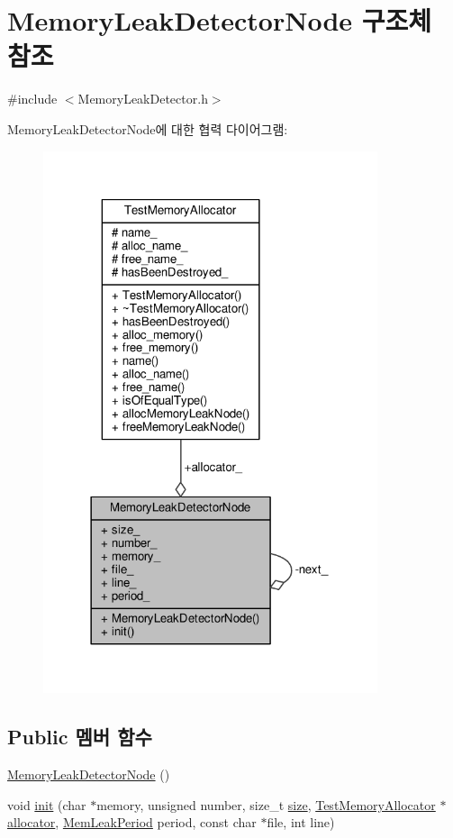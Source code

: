 \hypertarget{struct_memory_leak_detector_node}{}\section{Memory\+Leak\+Detector\+Node 구조체 참조}
\label{struct_memory_leak_detector_node}


{\ttfamily \#include $<$Memory\+Leak\+Detector.\+h$>$}



Memory\+Leak\+Detector\+Node에 대한 협력 다이어그램\+:
\nopagebreak
\begin{figure}[H]
\begin{center}
\leavevmode
\includegraphics[width=278pt]{struct_memory_leak_detector_node__coll__graph}
\end{center}
\end{figure}
\subsection*{Public 멤버 함수}
\begin{DoxyCompactItemize}
\item 
\hyperlink{struct_memory_leak_detector_node_a0a5488a7d8c5e1e7c7a551f68d331af9}{Memory\+Leak\+Detector\+Node} ()
\item 
void \hyperlink{struct_memory_leak_detector_node_aabfd3c84a772881892c1d9e48fa11b7b}{init} (char $\ast$memory, unsigned number, size\+\_\+t \hyperlink{gst__avb__playbin_8c_a439227feff9d7f55384e8780cfc2eb82}{size}, \hyperlink{class_test_memory_allocator}{Test\+Memory\+Allocator} $\ast$\hyperlink{_memory_leak_warning_test_8cpp_a83fc2e9b9142613f7df2bcc3ff8292bc}{allocator}, \hyperlink{_memory_leak_detector_8h_ab248e6cc6c6699b88b002286d8a3ed76}{Mem\+Leak\+Period} period, const char $\ast$file, int line)
\end{DoxyCompactItemize}
